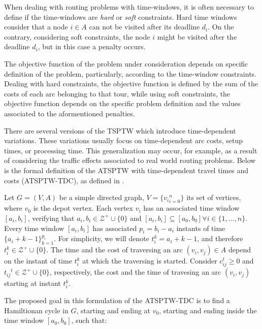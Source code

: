 When dealing with routing problems with time-windows, it is often necessary to define 
if the time-windows are \textit{hard} or \textit{soft} constraints.
Hard time windows consider that a node $i \in A$ can not be visited after its 
deadline $d_{i}$. On the contrary, considering soft constraints,
the node $i$ might be visited after the deadline $d_{i}$,
but in this case a penalty occurs.

The objective function of the problem under consideration depends on specific definition of 
the problem, particularly, according to the time-window constraints.
Dealing with hard constraints, the objective function is defined by the sum of the costs of each arc 
belonging to that tour, while using soft constraints, the objective function depends 
on the specific problem definition and the values associated to the aformentioned penalties.

There are several versions of the TSPTW which introduce time-dependent variations.
These variations usually focus on time-dependent arc costs, setup times, or processing time.
This generalization may occur, for example, as a result of considering the traffic effects associated to real world routing problems. 
Below is the formal definition of the ATSPTW with time-dependent travel times and costs (ATSPTW-TDC),
as defined in \cite{tsptw_exact}.

Let $G= (V,A)$ be a simple directed graph, $V=\{{v_{i}}_{i=0}^{n}\}$ its set of vertices,
where $v_0$ is the depot vertex. Each vertex $v_i$ has an associated time window $[a_{i}, b_{i}]$,
verifying that $a_i, b_i \in \mathcal{Z}^+ \cup \{0\}$ and $[a_{i}, b_{i}] \subseteq [a_{0}, b_{0}] \forall i \in \{1,...,n\}$.
Every time window $[a_{i}, b_{i}]$ has associated $p_i = b_i - a_i$ instants of time $\{a_i + k -1\}_{k=1}^{p_{i}}$.
For simplicity, we will denote $t_{i}^{k} = a_i + k -1$, and therefore $t_{i}^{k} \in \mathcal{Z}^+ \cup \{0\}$.
The time and the cost of traversing an arc $(v_i, v_j) \in A$ depend on the instant of time $t_{i}^{k}$ at which the traversing is started.
Consider $c_{ij}^{t} \geq 0$ and $t_{ij}{^t} \in \mathcal{Z}^+ \cup \{0\}$, respectively, the cost and the time 
of travesing an arc $(v_i, v_j)$ starting at instant $t_{i}^{k}$.

The proposed goal in this formulation of the ATSPTW-TDC is to find a Hamiltionan cycle in $G$,
starting and ending at $v_0$, starting and ending inside the time window $[a_0, b_0]$, such that:

